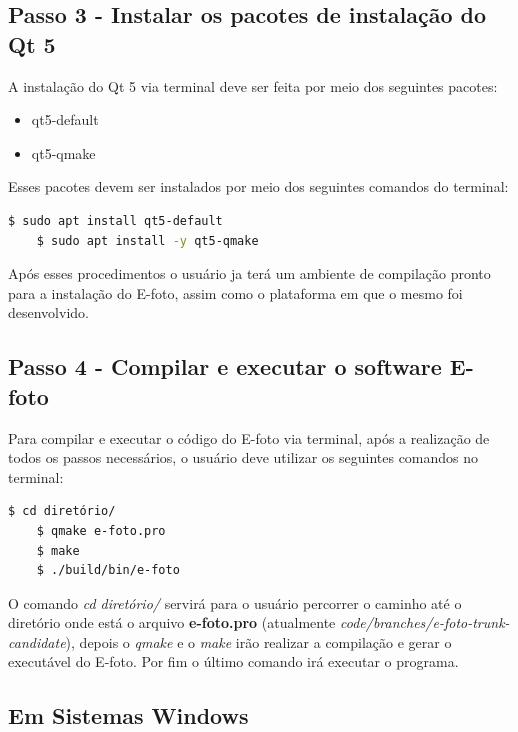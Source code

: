 \subsection{Passo 3 - Instalar os pacotes de instalação do Qt 5}   
A instalação do Qt 5 via terminal deve ser feita por meio dos seguintes pacotes:
\begin{itemize}
	\item qt5-default
	\item qt5-qmake
\end{itemize}   
Esses pacotes devem ser instalados por meio dos seguintes comandos do terminal:
\begin{lstlisting}[language=bash]
	$ sudo apt install qt5-default
	$ sudo apt install -y qt5-qmake
\end{lstlisting}	
    
Após esses procedimentos o usuário ja terá um ambiente de compilação pronto para a instalação do E-foto, assim como o plataforma em que o mesmo foi desenvolvido.
    
\subsection{Passo 4 - Compilar e executar o software E-foto}
Para compilar e executar o código do E-foto via terminal, após a realização de todos os passos necessários, o usuário deve utilizar os seguintes comandos no terminal:
\begin{lstlisting}[language=bash]
   	$ cd diretório/
   	$ qmake e-foto.pro
   	$ make
   	$ ./build/bin/e-foto
\end{lstlisting}
   
O comando \textit{cd diretório/} servirá para o usuário percorrer o caminho até o diretório onde está o arquivo \textbf{e-foto.pro} (atualmente \textit{code/branches/e-foto-trunk-candidate}), depois o \textit{qmake} e o \textit{make} irão realizar a compilação e gerar o executável do E-foto. Por fim o último comando irá executar o programa.

\subsection{Em Sistemas Windows}


